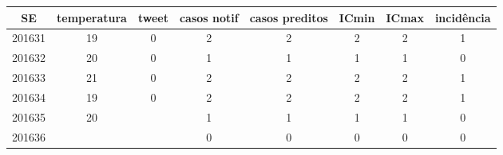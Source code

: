\begin{tabular}{c|ccccccc}
  \hline
SE & temperatura & tweet & casos notif & casos preditos & ICmin & ICmax & incidência \\ 
  \hline
201631 & 19 & 0 & 2 & 2 & 2 & 2 & 1 \\ 
  201632 & 20 & 0 & 1 & 1 & 1 & 1 & 0 \\ 
  201633 & 21 & 0 & 2 & 2 & 2 & 2 & 1 \\ 
  201634 & 19 & 0 & 2 & 2 & 2 & 2 & 1 \\ 
  201635 & 20 &  & 1 & 1 & 1 & 1 & 0 \\ 
  201636 &  &  & 0 & 0 & 0 & 0 & 0 \\ 
   \hline
\end{tabular}
